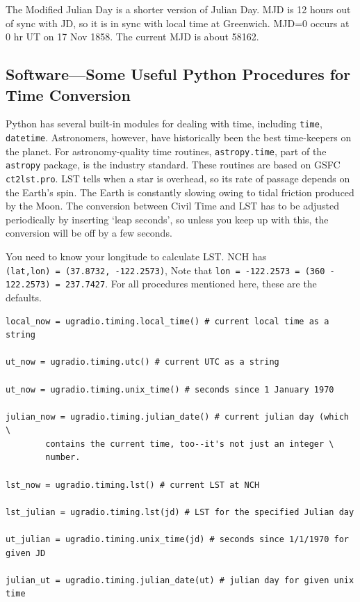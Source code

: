 \documentclass[12pt,preprint]{aastex}
\begin{document}
The Modified Julian Day is a shorter version of Julian Day. MJD is 12
hours out of sync with JD, so it is in sync with local time at
Greenwich. MJD=0 occurs at 0 hr UT on 17 Nov 1858.  The current MJD is
about 58162. %

\subsection{ Software---Some Useful Python Procedures for Time Conversion}

Python has several built-in modules for dealing with time, including {\tt time}, {\tt datetime}.
Astronomers, however, have historically been the best time-keepers on the planet.  For
astronomy-quality time routines, {\tt astropy.time}, part of the {\tt astropy} package, is
the industry standard.
These routines are based on GSFC {\tt ct2lst.pro}. LST tells when a star
is overhead, so its rate of passage depends on the Earth's spin. The
Earth is constantly slowing owing to tidal friction produced by the
Moon. The conversion between Civil Time and LST has to be adjusted
periodically by inserting `leap seconds', so unless you keep up with
this, the conversion will be off by a few seconds. 

You need to know your
longitude to calculate LST. NCH has \\
{\tt (lat,lon) = (37.8732, -122.2573)},  Note that {\tt lon = -122.2573 = (360 - 122.2573) = 237.7427}. 
For all procedures mentioned here, these are the defaults.

\begin{verbatim}
local_now = ugradio.timing.local_time() # current local time as a string

ut_now = ugradio.timing.utc() # current UTC as a string

ut_now = ugradio.timing.unix_time() # seconds since 1 January 1970

julian_now = ugradio.timing.julian_date() # current julian day (which \
        contains the current time, too--it's not just an integer \
        number. 
                                                                               
lst_now = ugradio.timing.lst() # current LST at NCH
                                                                               
lst_julian = ugradio.timing.lst(jd) # LST for the specified Julian day                                                             
                                                                               
ut_julian = ugradio.timing.unix_time(jd) # seconds since 1/1/1970 for given JD
                                                                               
julian_ut = ugradio.timing.julian_date(ut) # julian day for given unix time
\end{verbatim}
\end{document}
